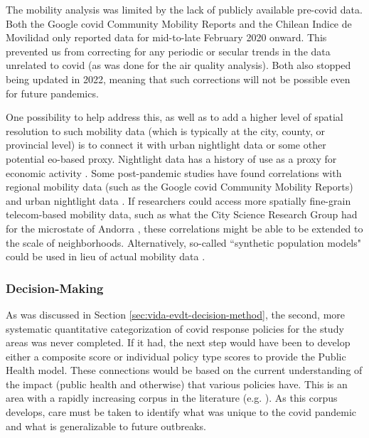 The mobility analysis was limited by the lack of publicly available pre-covid data. Both the Google \ac{covid} Community Mobility Reports \cite{googleCOVID19CommunityMobility} and the Chilean Indice de Movilidad \cite{ministeriodecienciatecnologiaconocimientoeinnovacionDatosCOVID192021} only reported data for mid-to-late February 2020 onward. This prevented us from correcting for any periodic or secular trends in the data unrelated to \ac{covid} (as was done for the air quality analysis). Both also stopped being updated in 2022, meaning that such corrections will not be possible even for future pandemics. 

One possibility to help address this, as well as to add a higher level of spatial resolution to such mobility data (which is typically at the city, county, or provincial level) is to connect it with urban nightlight data or some other potential \ac{eo}-based proxy. Nightlight data has a history of use as a proxy for economic activity \cite{delvalleMangrovesProtectCoastal2020}. Some post-pandemic studies have found correlations with regional mobility data (such as the Google \ac{covid} Community Mobility Reports) and urban nightlight data \cite{schweikertMobilityNightlightsAir2022}. If researchers could access more spatially fine-grain telecom-based mobility data, such as what the City Science Research Group had for the microstate of Andorra \cite{doorleyMobilityCOVID19Andorra2022}, these correlations might be able to be extended to the scale of neighborhoods. Alternatively, so-called ``synthetic population models" could be used in lieu of actual mobility data \cite{akbarpourSocioeconomicNetworkHeterogeneity2020}.

\subsubsection{Decision-Making}

As was discussed in Section \ref{sec:vida-evdt-decision-method}, the second, more systematic quantitative categorization of \ac{covid} response policies for the study areas was never completed. If it had, the next step would have been to develop either a composite score or individual policy type scores to provide the Public Health model. These connections would be based on the current understanding of the impact (public health and otherwise) that various policies have. This is an area with a rapidly increasing corpus in the literature (e.g. \cite{bennettAllThingsEqual2021, wibbensWhichCOVIDPolicies2020, dergiadesEffectivenessGovernmentPolicies2020}). As this corpus develops, care must be taken to identify what was unique to the \ac{covid} pandemic and what is generalizable to future outbreaks.

